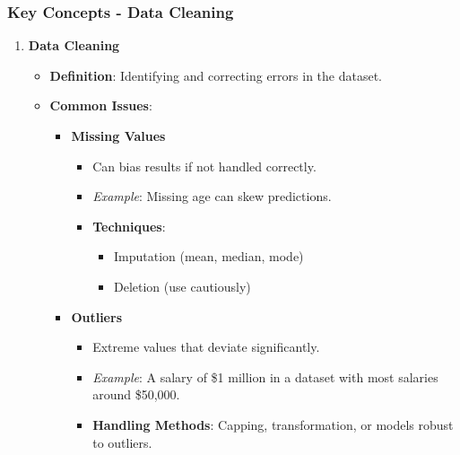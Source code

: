 \documentclass[aspectratio=169]{beamer}
\begin{document}
\begin{frame}[fragile]
    \frametitle{Key Concepts - Data Cleaning}
    \begin{enumerate}
        \item \textbf{Data Cleaning}
        \begin{itemize}
            \item \textbf{Definition}: Identifying and correcting errors in the dataset.
            \item \textbf{Common Issues}:
            \begin{itemize}
                \item \textbf{Missing Values}
                \begin{itemize}
                    \item Can bias results if not handled correctly.
                    \item \emph{Example}: Missing age can skew predictions.
                    \item \textbf{Techniques}:
                    \begin{itemize}
                        \item Imputation (mean, median, mode)
                        \item Deletion (use cautiously)
                    \end{itemize}
                \end{itemize}
                \item \textbf{Outliers}
                \begin{itemize}
                    \item Extreme values that deviate significantly.
                    \item \emph{Example}: A salary of \$1 million in a dataset with most salaries around \$50,000.
                    \item \textbf{Handling Methods}: Capping, transformation, or models robust to outliers.
                \end{itemize}
            \end{itemize}
        \end{itemize}
    \end{enumerate}
\end{frame}
\end{document}
